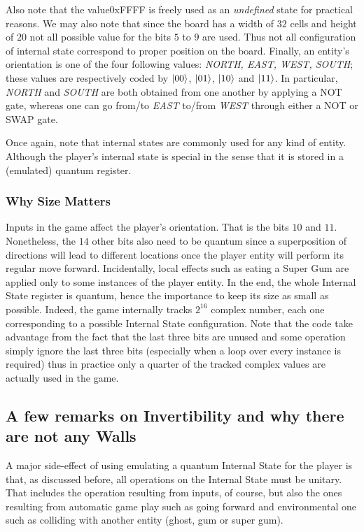 \documentclass[a4paper]{article}
\begin{document}
Also note that the value0xFFFF is freely used as an \emph{undefined} state for practical reasons. We may also note that since the board has a width of $32$ cells and height of $20$ not all possible value for the bits $5$ to $9$ are used. Thus not all configuration of internal state correspond to proper position on the board. Finally, an entity’s orientation is one of the four following values: \emph{NORTH, EAST, WEST, SOUTH}; these values are respectively coded by $\left| 00 \right>$, $\left| 01 \right>$, $\left| 10 \right>$ and $\left| 11 \right>$. In particular, \emph{NORTH} and \emph{SOUTH} are both obtained from one another by applying a NOT gate, whereas one can go from/to \emph{EAST} to/from  \emph{WEST} through either a NOT or SWAP gate.

Once again, note that internal states are commonly used for any kind of entity. Although the player’s internal state is special in the sense that it is stored in a (emulated) quantum register. 

\subsubsection{Why Size Matters}

Inputs in the game affect the player’s orientation. That is the bits $10$ and $11$. Nonetheless, the $14$ other bits also need to be quantum since a superposition of directions will lead to different locations once the player entity will perform its regular move forward.
Incidentally, local effects such as eating a Super Gum are applied only to some instances of the player entity. In the end, the whole Internal State register is quantum, hence the importance to keep its size as small as possible. Indeed, the game internally tracks $2^{16}$ complex number, each one corresponding to a possible Internal State configuration. Note that the code take advantage from the fact that the last three bits are unused and some operation simply ignore the last three bits (especially when a loop over every instance is required) thus in practice only a quarter of the tracked complex values are actually used in the game.

\subsection{A few remarks on Invertibility and why there are not any Walls}

A major side-effect of using emulating a quantum Internal State for the player is that, as discussed before, all operations on the Internal State must be unitary. That includes the operation resulting from inputs, of course, but also the ones resulting from automatic game play such as going forward and environmental one such as colliding with another entity (ghost, gum or super gum). 
\end{document}
